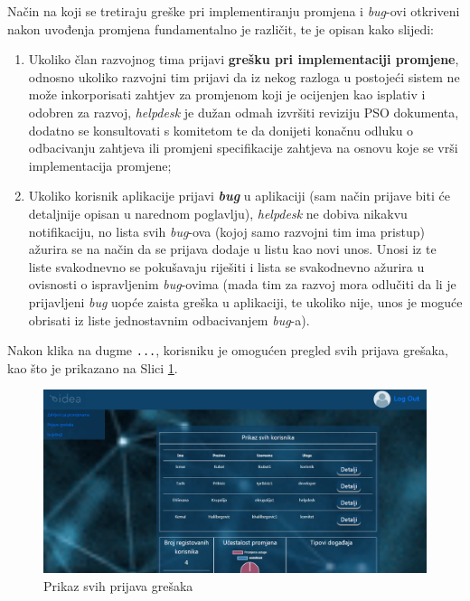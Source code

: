 \documentclass[12pt,a4paper]{article}
\begin{document}
Način na koji se tretiraju greške pri implementiranju promjena i \textit{bug}-ovi otkriveni nakon uvođenja promjena fundamentalno je različit, te je opisan kako slijedi:
\begin{enumerate}
\item Ukoliko član razvojnog tima prijavi \textbf{grešku pri implementaciji promjene}, odnosno ukoliko razvojni tim prijavi da iz nekog razloga u postojeći sistem ne može inkorporisati zahtjev za promjenom koji je ocijenjen kao isplativ i odobren za razvoj, \textit{helpdesk} je dužan odmah izvršiti reviziju PSO dokumenta, dodatno se konsultovati s komitetom te da donijeti konačnu odluku o odbacivanju zahtjeva ili promjeni specifikacije zahtjeva na osnovu koje se vrši implementacija promjene;
\item Ukoliko korisnik aplikacije prijavi \textbf{\textit{bug}} u aplikaciji (sam način prijave biti će detaljnije opisan u narednom poglavlju), \textit{helpdesk} ne dobiva nikakvu notifikaciju, no lista svih \textit{bug}-ova (kojoj samo razvojni tim ima pristup) ažurira se na način da se prijava dodaje u listu kao novi unos. Unosi iz te liste svakodnevno se pokušavaju riješiti i lista se svakodnevno ažurira u ovisnosti o ispravljenim \textit{bug}-ovima (mada tim za razvoj mora odlučiti da li je prijavljeni \textit{bug} uopće zaista greška u aplikaciji, te ukoliko nije, unos je moguće obrisati iz liste jednostavnim odbacivanjem \textit{bug}-a).
\end{enumerate}

Nakon klika na dugme \texttt{...}, korisniku je omogućen pregled svih prijava grešaka, kao što je prikazano na Slici \ref{s12}.

\begin{figure}[H]
\center
\includegraphics[scale=0.35]{../res/UI/report1.PNG}
\caption{Prikaz svih prijava grešaka}
\label{s12}
\end{figure}
\end{document}
